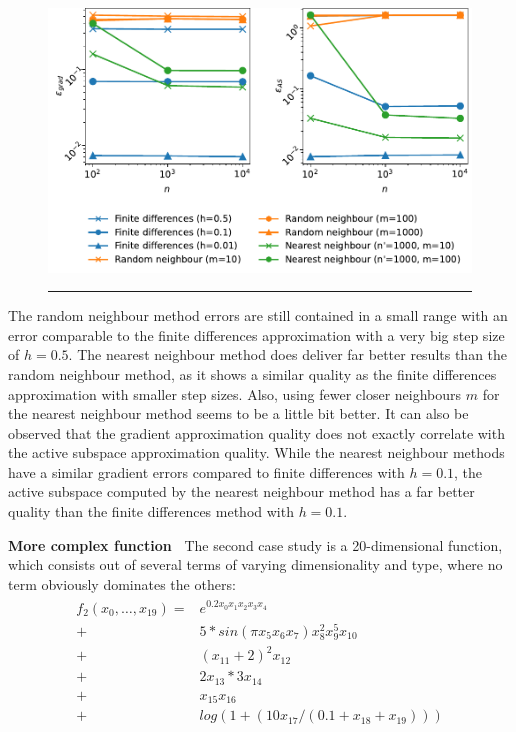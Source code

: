 \documentclass[
  a4paper,  %
  twoside,  %
  bibliography=totoc,
  headsepline,
  cleardoublepage=empty,
  parskip=half,
  draft=false
]{scrbook}
\newcommand{\delimit}{{\color{silver}\noindent\rule{\textwidth}{1pt}}}
\begin{document}
\newpage
\begin{mdframed}[style=style]
\begin{figure}[H]
\centering
	\includegraphics[width=\textwidth]{graphics/as_errors_f1}
\delimit
	\label{fig:as_errors_f1}
\end{figure}
\end{mdframed}

The random neighbour method errors are still contained in a small range with an error comparable to the finite differences approximation with a very big step size of $h=0.5$.
The nearest neighbour method does deliver far better results than the random neighbour method, as it shows a similar quality as the finite differences approximation with smaller step sizes.
Also, using fewer closer neighbours $m$ for the nearest neighbour method seems to be a little bit better.
It can also be observed that the gradient approximation quality does not exactly correlate with the active subspace approximation quality.
While the nearest neighbour methods have a similar gradient errors compared to finite differences with $h=0.1$, the active subspace computed by the nearest neighbour method has a far better quality than the finite differences method with $h=0.1$.

\vspace{2mm}
\textbf{More complex function~}
The second case study is a 20-dimensional function, which consists out of several terms of varying dimensionality and type, where no term obviously dominates the others:
\begin{align}
\begin{split}
f_2(x_0, \dots, x_{19})=&e^{0.2 x_0 x_1 x_2 x_3 x_4}\\
+ &5 * sin(\pi x_5 x_6 x_7) x_8^2 x_9^5 x_{10}\\
+ &(x_{11} + 2)^2 x_{12}\\
+ &2 x_{13} * 3 x_{14}\\
+ &x_{15} x_{16}\\
+ &log(1 + (10 x_{17} / (0.1 + x_{18} + x_{19})))
\end{split}
\end{align}
\end{document}
